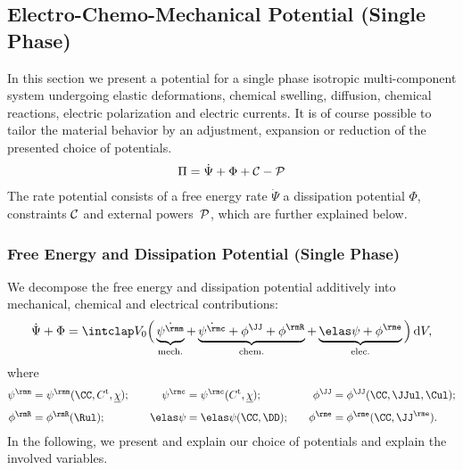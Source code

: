 \subsection{Electro-Chemo-Mechanical Potential (Single Phase)} \label{sec:singlePhase} %

In this section we present a potential for a single phase isotropic multi-component system undergoing elastic deformations, chemical swelling, diffusion, chemical reactions, electric polarization and electric currents. It is of course possible to tailor the material behavior by an adjustment, expansion or reduction of the presented choice of potentials.
\begin{align}
  \Pi = \dot\Psi + \Phi + \mathcal{C} - \mathcal{P}
\end{align}
The rate potential consists of a free energy rate $\dot\Psi$ a dissipation potential $\Phi$, constraints $\mathcal{C}$ and external powers~$\mathcal{P}$, which are further explained below.  

\subsubsection{Free Energy and Dissipation Potential (Single Phase)} \label{sec:singlePhase_psiphi}%
We decompose the free energy and dissipation potential additively into mechanical, chemical and electrical contributions: 
\begin{align}
  \dot\Psi + \Phi = \intVO \Big( \underbrace{\dot\psim}_{\text{mech.}} + \underbrace{\dot\psic + \phiJJ + \phiR}_{\text{chem.}} + \underbrace{\psie + \phie}_{\text{elec.}} \Big) \dV,
\end{align}
where 
\begin{align}
  \begin{alignedat}{3}
    \psim&=\psim(\CC,\Ct,\chiul); &\qquad \psic&=\psic(\Ct,\chiul); &\qquad \phiJJ&=\phiJJ(\CC,\JJul,\Cul); \\[3pt]
    \phiR&=\phiR(\Rul); &\qquad \psie&=\psie(\CC,\DD); & \qquad \phie&=\phie(\CC,\JJe).
  \end{alignedat}
\end{align}
In the following, we present and explain our choice of potentials and explain the involved variables.

